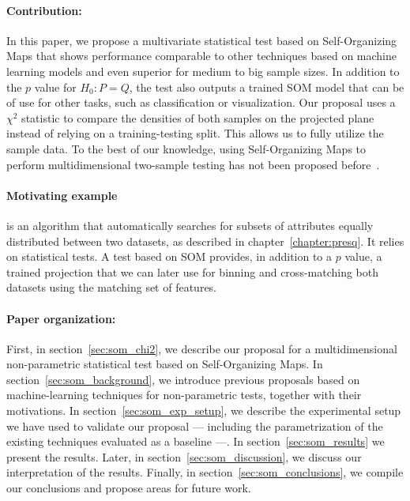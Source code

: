 \paragraph{Contribution:} In this paper, we propose a multivariate statistical test based on
Self-Organizing Maps that shows performance comparable to other techniques based on 
machine learning models and even superior for medium to big sample sizes. In addition to the 
$p$ value for $H_0: P = Q$, the test also outputs a trained SOM model that can be of
use for other tasks, such as classification or visualization.
Our proposal uses a $\chi^2$ statistic to compare the densities of both samples on
the projected plane instead of relying on a training-testing split. This allows us to fully
utilize the sample data. To the best of our knowledge, using Self-Organizing Maps
to perform multidimensional two-sample testing has not been proposed
before~\cite{kaski1998bibliography,oja_bibliography_2003,polla_bibliography_2006}.

\paragraph{Motivating example} \PresQ is an algorithm that automatically searches
for subsets of attributes equally distributed between two datasets, as
described in chapter~\ref{chapter:presq}.
It relies on statistical tests. A test based on SOM provides, in addition to a $p$ value,
a trained projection that we can later use for binning and cross-matching both datasets using
the matching set of features.

\paragraph{Paper organization:} First, in section~\ref{sec:som_chi2}, we describe our proposal
for a multidimensional non-parametric statistical test based on Self-Organizing Maps.
In section~\ref{sec:som_background}, we introduce previous proposals based on machine-learning
techniques for non-parametric tests, together with their motivations.
In section~\ref{sec:som_exp_setup}, we describe the experimental setup we have used
to validate our proposal --- including the parametrization of the existing techniques
evaluated as a baseline ---. In section~\ref{sec:som_results} we present the results.
Later, in section~\ref{sec:som_discussion}, we discuss our interpretation of the results.
Finally, in section~\ref{sec:som_conclusions}, we compile our conclusions and propose areas for future
work.


